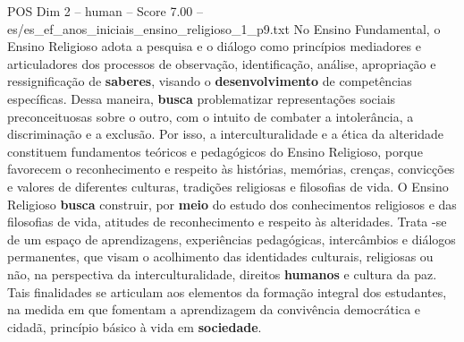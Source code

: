 \begin{textsample}{POS Dim 2 – human – Score 7.00 – es/es\_ef\_anos\_iniciais\_ensino\_religioso\_1\_p9.txt}  \label{ex:f2_pos_009}
No Ensino Fundamental, o Ensino Religioso adota a pesquisa e o diálogo como princípios mediadores e articuladores dos processos de observação, identificação, análise, apropriação e ressignificação de \textbf{saberes}, visando o \textbf{desenvolvimento} de competências específicas.
Dessa maneira, \textbf{busca} problematizar representações sociais preconceituosas sobre o outro, com o intuito de combater a intolerância, a discriminação e a exclusão.
Por isso, a interculturalidade e a ética da alteridade constituem fundamentos teóricos e pedagógicos do Ensino Religioso, porque favorecem o reconhecimento e respeito às histórias, memórias, crenças, convicções e valores de diferentes culturas, tradições religiosas e filosofias de vida.
O Ensino Religioso \textbf{busca} construir, por \textbf{meio} do estudo dos conhecimentos religiosos e das filosofias de vida, atitudes de reconhecimento e respeito às alteridades.
Trata -se de um espaço de aprendizagens, experiências pedagógicas, intercâmbios e diálogos permanentes, que visam o acolhimento das identidades culturais, religiosas ou não, na perspectiva da interculturalidade, direitos \textbf{humanos} e cultura da paz.
Tais finalidades se articulam aos elementos da formação integral dos estudantes, na medida em que fomentam a aprendizagem da convivência democrática e cidadã, princípio básico à vida em \textbf{sociedade}.

\end{textsample}

